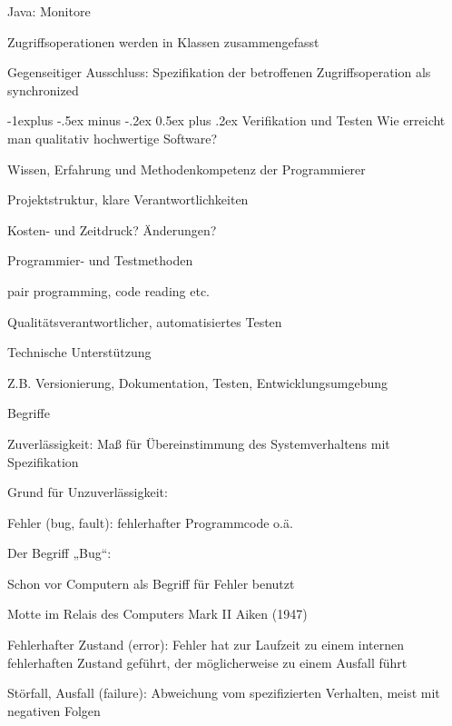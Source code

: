 \documentclass[a4paper]{article}
\makeatletter
\renewcommand{\subsection}{\@startsection{subsection}{2}{0mm}%
                                {-1explus -.5ex minus -.2ex}%
                                {0.5ex plus .2ex}%
                                {\normalfont\normalsize\bfseries}}
\makeatother
\begin{document}
\begin{multicols}{3}
  Java: Monitore
  \begin{itemize*}
    \item Zugriffsoperationen werden in Klassen zusammengefasst
    \item Gegenseitiger Ausschluss: Spezifikation der betroffenen Zugriffsoperation als synchronized
  \end{itemize*}

  \subsection{Verifikation und Testen}
  Wie erreicht man qualitativ hochwertige Software?
  \begin{itemize*}
    \item Wissen, Erfahrung und Methodenkompetenz der Programmierer
    \item Projektstruktur, klare Verantwortlichkeiten
    \item Kosten- und Zeitdruck? Änderungen?
    \item Programmier- und Testmethoden
    \begin{itemize*}
      \item pair programming, code reading etc.
      \item Qualitätsverantwortlicher, automatisiertes Testen
    \end{itemize*}
    \item Technische Unterstützung
    \begin{itemize*}
      \item Z.B. Versionierung, Dokumentation, Testen, Entwicklungsumgebung
    \end{itemize*}
  \end{itemize*}

  Begriffe
  \begin{itemize*}
    \item Zuverlässigkeit: Maß für Übereinstimmung des Systemverhaltens mit Spezifikation
    \item Grund für Unzuverlässigkeit:
    \begin{itemize*}
      \item Fehler (bug, fault): fehlerhafter Programmcode o.ä.
      \item Der Begriff „Bug“:
      \begin{itemize*}
        \item Schon vor Computern als Begriff für Fehler benutzt
        \item Motte im Relais des Computers Mark II Aiken (1947)
      \end{itemize*}
    \end{itemize*}
    \item Fehlerhafter Zustand (error): Fehler hat zur Laufzeit zu einem internen fehlerhaften Zustand geführt, der möglicherweise zu einem Ausfall führt
    \item Störfall, Ausfall (failure): Abweichung vom spezifizierten Verhalten, meist mit negativen Folgen
  \end{itemize*}


\end{multicols}
\end{document}
